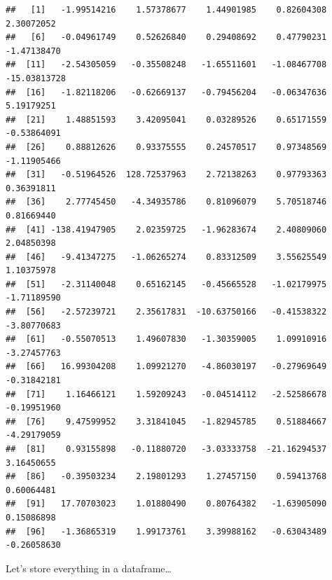 \documentclass[]{book}
\newenvironment{Shaded}{\begin{snugshade}}{\end{snugshade}}
\newcommand{\DataTypeTok}[1]{\textcolor[rgb]{0.13,0.29,0.53}{#1}}
\newcommand{\DecValTok}[1]{\textcolor[rgb]{0.00,0.00,0.81}{#1}}
\newcommand{\KeywordTok}[1]{\textcolor[rgb]{0.13,0.29,0.53}{\textbf{#1}}}
\newcommand{\NormalTok}[1]{#1}
\newcommand{\OperatorTok}[1]{\textcolor[rgb]{0.81,0.36,0.00}{\textbf{#1}}}
\newcommand{\StringTok}[1]{\textcolor[rgb]{0.31,0.60,0.02}{#1}}
\theoremstyle{definition}
\theoremstyle{definition}
\theoremstyle{definition}
\theoremstyle{remark}
\begin{document}
\begin{verbatim}
##   [1]   -1.99514216    1.57378677    1.44901985    0.82604308    2.30072052
##   [6]   -0.04961749    0.52626840    0.29408692    0.47790231   -1.47138470
##  [11]   -2.54305059   -0.35508248   -1.65511601   -1.08467708  -15.03813728
##  [16]   -1.82118206   -0.62669137   -0.79456204   -0.06347636    5.19179251
##  [21]    1.48851593    3.42095041    0.03289526    0.65171559   -0.53864091
##  [26]    0.88812626    0.93375555    0.24570517    0.97348569   -1.11905466
##  [31]   -0.51964526  128.72537963    2.72138263    0.97793363    0.36391811
##  [36]    2.77745450   -4.34935786    0.81096079    5.70518746    0.81669440
##  [41] -138.41947905    2.02359725   -1.96283674    2.40809060    2.04850398
##  [46]   -9.41347275   -1.06265274    0.83312509    3.55625549    1.10375978
##  [51]   -2.31140048    0.65162145   -0.45665528   -1.02179975   -1.71189590
##  [56]   -2.57239721    2.35617831  -10.63750166   -0.41538322   -3.80770683
##  [61]   -0.55070513    1.49607830   -1.30359005    1.09910916   -3.27457763
##  [66]   16.99304208    1.09921270   -4.86030197   -0.27969649   -0.31842181
##  [71]    1.16466121    1.59209243   -0.04514112   -2.52586678   -0.19951960
##  [76]    9.47599952    3.31841045   -1.82945785    0.51884667   -4.29179059
##  [81]    0.93155898   -0.11880720   -3.03333758  -21.16294537    3.16450655
##  [86]   -0.39503234    2.19801293    1.27457150    0.59413768    0.60064481
##  [91]   17.70703023    1.01880490    0.80764382   -1.63905090    0.15086898
##  [96]   -1.36865319    1.99173761    3.39988162   -0.63043489   -0.26058630
\end{verbatim}

Let's store everything in a dataframe\ldots{}

\begin{Shaded}
\end{Shaded}
\end{document}
